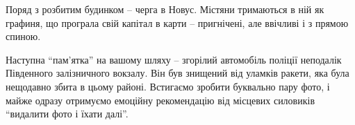 

Поряд з розбитим будинком – черга в Новус. Містяни тримаються в ній як графиня,
що програла свій капітал в карти – пригнічені, але ввічливі і з прямою спиною.

Наступна \enquote{пам'ятка} на вашому шляху – згорілий автомобіль поліції неподалік
Південного залізничного вокзалу. Він був знищений від уламків ракети, яка була
нещодавно збита в цьому районі. Встигаємо зробити буквально пару фото, і майже
одразу отримуємо емоційну рекомендацію від місцевих силовиків \enquote{видалити фото і
їхати далі}.
